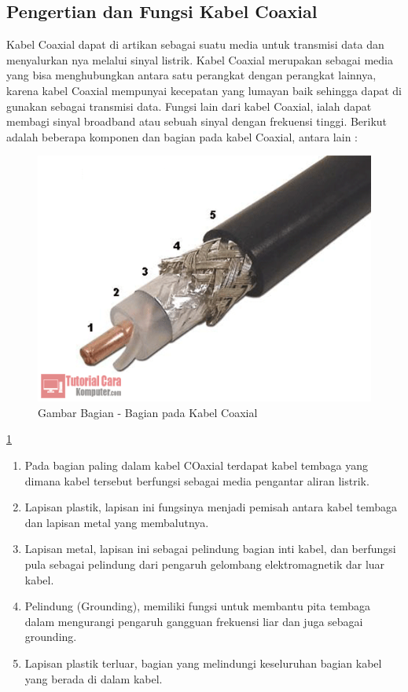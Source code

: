 \begin{itemize}
{\begin{itemize}
\begin{itemize}
	\subsection{Pengertian dan Fungsi Kabel Coaxial}
	Kabel Coaxial dapat di artikan sebagai suatu media untuk transmisi data dan menyalurkan nya melalui sinyal listrik. Kabel Coaxial merupakan sebagai media yang bisa menghubungkan antara satu perangkat dengan perangkat lainnya, karena kabel Coaxial mempunyai kecepatan yang lumayan baik sehingga dapat di gunakan sebagai transmisi data. Fungsi lain dari kabel Coaxial, ialah dapat membagi sinyal broadband atau sebuah sinyal dengan frekuensi tinggi. Berikut adalah beberapa komponen dan bagian pada kabel Coaxial, antara lain :
	\begin{figure} [ht]
	\centerline{\includegraphics[width=1\textwidth]{figures/bgncoax.png}}
	\caption{Gambar Bagian - Bagian pada Kabel Coaxial}
	\label{bgncoax}
	\end{figure}
	
	\ref{bgncoax}
		\begin{enumerate}
			\item Pada bagian paling dalam kabel COaxial terdapat kabel tembaga yang dimana kabel tersebut berfungsi sebagai media pengantar aliran listrik.
			\item Lapisan plastik, lapisan ini fungsinya menjadi pemisah antara kabel tembaga dan lapisan metal yang membalutnya.
			\item Lapisan metal, lapisan ini sebagai pelindung bagian inti kabel, dan berfungsi pula sebagai pelindung dari pengaruh gelombang elektromagnetik dar luar kabel.
			\item Pelindung (Grounding), memiliki fungsi untuk membantu pita tembaga dalam mengurangi pengaruh gangguan frekuensi liar dan juga sebagai grounding.
			\item Lapisan plastik terluar, bagian yang melindungi keseluruhan bagian kabel yang berada di dalam kabel.
		\end{enumerate}
		

\end{itemize}
\end{itemize}}
\end{itemize}
